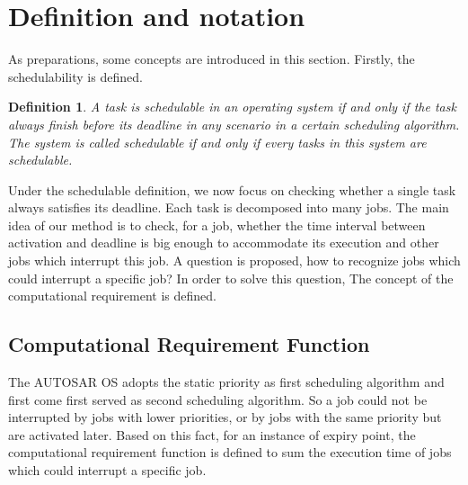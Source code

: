 \documentclass[10pt,conference]{IEEEtran}
\newtheorem{definition}{Definition}
\begin{document}

\section{Definition and notation}\label{section_definition}
As preparations, some concepts are introduced in this section. Firstly, the schedulability is defined.
\begin{definition}
A task is schedulable in an operating system if and only if the task always finish before its deadline in any scenario in a certain scheduling algorithm. The system is called schedulable if and only if every tasks in this system are schedulable. 
\end{definition}
Under the schedulable definition, we now focus on checking whether a single task always satisfies its deadline. Each task is decomposed into many jobs. The main idea of our method is to check, for a job, whether the time interval between activation and deadline is big enough to accommodate its execution and other jobs which interrupt this job. A question is proposed, how to recognize jobs which could interrupt a specific job? In order to solve this question, The concept of the computational requirement is defined.

\subsection{Computational Requirement Function}
The AUTOSAR OS adopts the static priority as first scheduling algorithm and first come first served as second scheduling algorithm. So a job could not be interrupted by jobs with lower priorities, or by jobs with the same priority but are activated later. Based on this fact, for an instance of expiry point, the computational requirement function is defined to sum the execution time of jobs which could interrupt a specific job.
\end{document}
